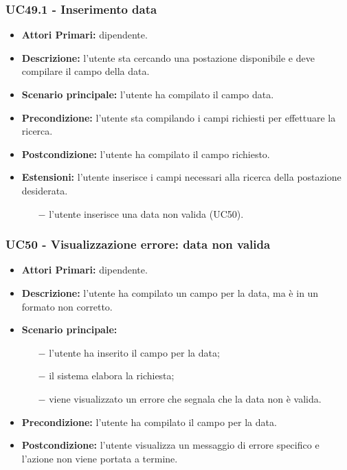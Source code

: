 \subsubsection{ UC49.1 - Inserimento data }
\begin{itemize}
	\item\textbf{Attori Primari:} dipendente.
	\item\textbf{Descrizione:} l’utente sta cercando una postazione disponibile e deve compilare il campo della data.
	\item\textbf{Scenario principale:} l’utente ha compilato il campo data.
	\item\textbf{Precondizione:} l’utente sta compilando i campi richiesti per effettuare la ricerca.
	\item\textbf{Postcondizione:} l’utente ha compilato il campo richiesto.
	\item\textbf{Estensioni:} l’utente inserisce i campi necessari alla ricerca della postazione desiderata.
	\begin{itemize}
		\item[$-$] l’utente inserisce una data non valida (UC50).
	\end{itemize}
\end{itemize}
\subsubsection{ UC50 - Visualizzazione errore: data non valida  }
\begin{itemize}
	\item\textbf{Attori Primari:} dipendente.
	\item\textbf{Descrizione:} l’utente ha compilato un campo per la data, ma è in un formato non corretto.
	\item\textbf{Scenario principale:} 
	\begin{itemize}
		\item[$-$] l’utente ha inserito il campo per la data;
		\item[$-$] il sistema elabora la richiesta;
		\item[$-$] viene visualizzato un errore che segnala che la data non è valida.
	\end{itemize}
	\item\textbf{Precondizione:} l’utente ha compilato il campo per la data.
	\item\textbf{Postcondizione:} l'utente visualizza un messaggio di errore specifico e l'azione non viene portata a termine.
\end{itemize}

